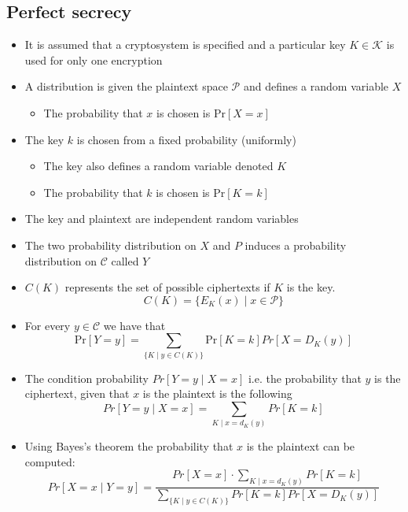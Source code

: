 \subsection{Perfect secrecy}
\begin{itemize}
	\item It is assumed that a cryptosystem is specified and a particular key $K \in \mathcal K$ is used for only one encryption
  \item A distribution is given the plaintext space $\mathcal P$ and defines a random variable $X$
  \begin{itemize}
  	\item The probability that $x$ is chosen is $\text{Pr}[X=x]$
  \end{itemize}
  \item The key $k$ is chosen from a fixed probability (uniformly)
  \begin{itemize}
  	\item The key also defines a random variable denoted $K$
  	\item The probability that $k$ is chosen is $\text{Pr}[K=k]$
  \end{itemize}
  \item The key and plaintext are independent random variables
  \item The two probability distribution on $X$ and $P$ induces a probability distribution on $\mathcal C$ called $Y$
  \item $C(K)$ represents the set of possible ciphertexts if $K$ is the key.
  \begin{equation*}
    C(K) = \{E_K(x) \mid x \in \mathcal P\}
  \end{equation*}
  \item For every $y \in \mathcal C$ we have that 
  \begin{equation*}
    \text{Pr}[Y=y] = \sum_{\{K \mid y \in C (K)\}} \text{Pr}[K=k] Pr[X = D_K(y)]
  \end{equation*}
  \item The condition probability $Pr[Y=y \mid X=x]$ i.e. the probability that $y$ is the ciphertext, given that $x$ is the plaintext is the following
  \begin{equation*}
    Pr[Y=y \mid X = x] = \sum_{K \mid x = d_K (y)} Pr[K=k]
  \end{equation*} 
  \item Using Bayes's theorem the probability that $x$ is the plaintext can be computed:
  \begin{equation*}
    Pr[X=x \mid Y = y] = \frac{Pr[X=x] \cdot \sum_{K \mid x = d_K (y)} Pr[K=k]}{\sum_{\{K \mid y \in C (K)\}} Pr[K=k] Pr[X = D_K(y)]} 

\end{equation*}
\end{itemize}
